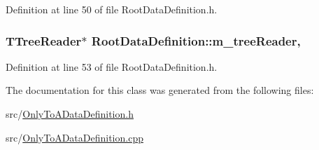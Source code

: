 Definition at line 50 of file Root\+Data\+Definition.\+h.

\hypertarget{classRootDataDefinition_a919827bdd245e61c0f54676d59cc7448}{
\subsubsection[{m\+\_\+tree\+Reader}]{\setlength{\rightskip}{0pt plus 5cm}T\+Tree\+Reader$\ast$ Root\+Data\+Definition\+::m\+\_\+tree\+Reader\hspace{0.3cm}{\ttfamily [protected]}, {\ttfamily [inherited]}}}\label{classRootDataDefinition_a919827bdd245e61c0f54676d59cc7448}


Definition at line 53 of file Root\+Data\+Definition.\+h.



The documentation for this class was generated from the following files\+:\begin{DoxyCompactItemize}
\item 
src/\hyperlink{OnlyToADataDefinition_8h}{Only\+To\+A\+Data\+Definition.\+h}\item 
src/\hyperlink{OnlyToADataDefinition_8cpp}{Only\+To\+A\+Data\+Definition.\+cpp}\end{DoxyCompactItemize}

